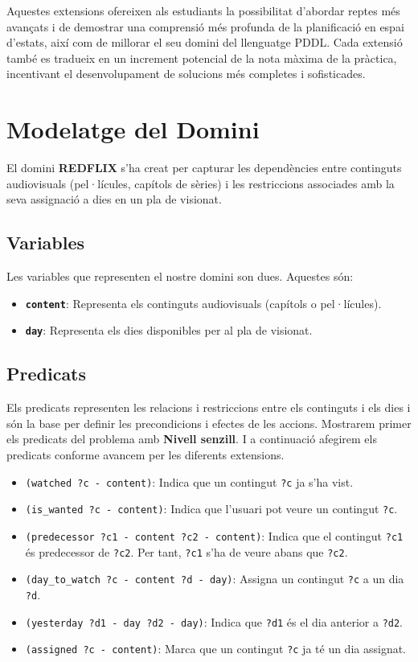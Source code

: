 \documentclass[a4paper]{article}
\begin{document}
	Aquestes extensions ofereixen als estudiants la possibilitat d'abordar reptes més avançats i de demostrar una comprensió més profunda de la planificació en espai d'estats, així com de millorar el seu domini del llenguatge PDDL. Cada extensió també es tradueix en un increment potencial de la nota màxima de la pràctica, incentivant el desenvolupament de solucions més completes i sofisticades.
	
	\newpage
	\section{Modelatge del Domini}
	
	El domini \textbf{REDFLIX} s'ha creat per capturar les dependències entre continguts audiovisuals (pel·lícules, capítols de sèries) i les restriccions associades amb la seva assignació a dies en un pla de visionat.
	
	\subsection{Variables}
	
	Les variables que representen el nostre domini son dues. Aquestes són:
	
	\begin{itemize}
		\item \textbf{\texttt{content}}: Representa els continguts audiovisuals (capítols o pel·lícules).
		\item \textbf{\texttt{day}}: Representa els dies disponibles per al pla de visionat.
	\end{itemize}
	
	\subsection{Predicats}
	
	Els predicats representen les relacions i restriccions entre els continguts i els dies i són la base per definir les precondicions i efectes de les accions. Mostrarem primer els predicats del problema amb \textbf{Nivell senzill}. I a continuació afegirem els predicats conforme avancem per les diferents extensions.
	
	\begin{itemize}
		\item \texttt{(watched ?c - content)}: Indica que un contingut \texttt{?c} ja s'ha vist.
		\item \texttt{(is\_wanted ?c - content)}: Indica que l'usuari pot veure un contingut \texttt{?c}.
		\item \texttt{(predecessor ?c1 - content ?c2 - content)}: Indica que el contingut \texttt{?c1} és predecessor de \texttt{?c2}. Per tant, \texttt{?c1} s'ha de veure abans que \texttt{?c2}.
		\item \texttt{(day\_to\_watch ?c - content ?d - day)}: Assigna un contingut \texttt{?c} a un dia \texttt{?d}.
		\item \texttt{(yesterday ?d1 - day ?d2 - day)}: Indica que \texttt{?d1} és el dia anterior a \texttt{?d2}.
		\item \texttt{(assigned ?c - content)}: Marca que un contingut \texttt{?c} ja té un dia assignat.
	\end{itemize}
	
\end{document}
